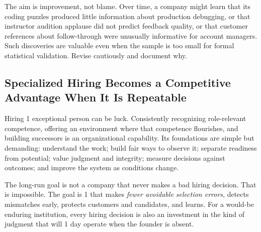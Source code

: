 The aim is improvement, not blame. Over time, a company might learn that its coding puzzles produced little information about production debugging, or that instructor audition applause did not predict feedback quality, or that customer references about follow-through were unusually informative for account managers. Such discoveries are valuable even when the sample is too small for formal statistical validation. Revise cautiously and document why.

\subsection{Specialized Hiring Becomes a Competitive Advantage When It Is Repeatable}
\label{sec:repeatable_advantage}

Hiring 1 exceptional person can be luck. Consistently recognizing role-relevant competence, offering an environment where that competence flourishes, and building successors is an organizational capability. Its foundations are simple but demanding: understand the work; build fair ways to observe it; separate readiness from potential; value judgment and integrity; measure decisions against outcomes; and improve the system as conditions change.

The long-run goal is not a company that never makes a bad hiring decision. That is impossible. The goal is 1 that makes \textit{fewer avoidable selection errors}, detects mismatches early, protects customers and candidates, and learns. For a would-be enduring institution, every hiring decision is also an investment in the kind of judgment that will 1 day operate when the founder is absent.

